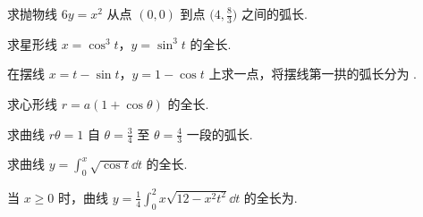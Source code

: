 	\begin{ti}
		求抛物线 $6y = x^{2}$ 从点 $(0,0)$ 到点 $\bigl( 4,\frac{8}{3} \bigr)$ 之间的弧长.
	\end{ti}

	\begin{ti}
		求星形线 $x = \cos^{3}t$，$y = \sin^{3}t$ 的全长.
	\end{ti}

	\begin{ti}
		在摆线 $x = t - \sin t$，$y = 1 - \cos t$ 上求一点，将摆线第一拱的弧长分为 .
	\end{ti}

	\begin{ti}
		求心形线 $r = a (1 + \cos \theta)$ 的全长.
	\end{ti}

	\begin{ti}
		求曲线 $r \theta = 1$ 自 $\theta = \frac{3}{4}$ 至 $\theta = \frac{4}{3}$ 一段的弧长.
	\end{ti}

	\begin{ti}
		求曲线 $y = \int_{0}^{x} \sqrt{\cos t} \dd{t}$ 的全长.
	\end{ti}

	\begin{ti}
		当 $x \geq 0$ 时，曲线 $y = \frac{1}{4} \int_{0}^{2} x \sqrt{12 - x^{2} t^{2}} \dd{t}$ 的全长为\hone{4}.
	\end{ti}


